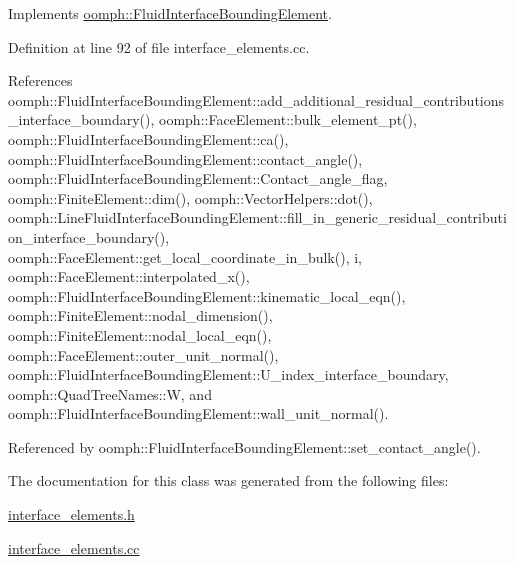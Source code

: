 Implements \hyperlink{classoomph_1_1FluidInterfaceBoundingElement_a69fa099e0cbfe8ae028a4edc77fedc60}{oomph\+::\+Fluid\+Interface\+Bounding\+Element}.



Definition at line 92 of file interface\+\_\+elements.\+cc.



References oomph\+::\+Fluid\+Interface\+Bounding\+Element\+::add\+\_\+additional\+\_\+residual\+\_\+contributions\+\_\+interface\+\_\+boundary(), oomph\+::\+Face\+Element\+::bulk\+\_\+element\+\_\+pt(), oomph\+::\+Fluid\+Interface\+Bounding\+Element\+::ca(), oomph\+::\+Fluid\+Interface\+Bounding\+Element\+::contact\+\_\+angle(), oomph\+::\+Fluid\+Interface\+Bounding\+Element\+::\+Contact\+\_\+angle\+\_\+flag, oomph\+::\+Finite\+Element\+::dim(), oomph\+::\+Vector\+Helpers\+::dot(), oomph\+::\+Line\+Fluid\+Interface\+Bounding\+Element\+::fill\+\_\+in\+\_\+generic\+\_\+residual\+\_\+contribution\+\_\+interface\+\_\+boundary(), oomph\+::\+Face\+Element\+::get\+\_\+local\+\_\+coordinate\+\_\+in\+\_\+bulk(), i, oomph\+::\+Face\+Element\+::interpolated\+\_\+x(), oomph\+::\+Fluid\+Interface\+Bounding\+Element\+::kinematic\+\_\+local\+\_\+eqn(), oomph\+::\+Finite\+Element\+::nodal\+\_\+dimension(), oomph\+::\+Finite\+Element\+::nodal\+\_\+local\+\_\+eqn(), oomph\+::\+Face\+Element\+::outer\+\_\+unit\+\_\+normal(), oomph\+::\+Fluid\+Interface\+Bounding\+Element\+::\+U\+\_\+index\+\_\+interface\+\_\+boundary, oomph\+::\+Quad\+Tree\+Names\+::W, and oomph\+::\+Fluid\+Interface\+Bounding\+Element\+::wall\+\_\+unit\+\_\+normal().



Referenced by oomph\+::\+Fluid\+Interface\+Bounding\+Element\+::set\+\_\+contact\+\_\+angle().



The documentation for this class was generated from the following files\+:\begin{DoxyCompactItemize}
\item 
\hyperlink{interface__elements_8h}{interface\+\_\+elements.\+h}\item 
\hyperlink{interface__elements_8cc}{interface\+\_\+elements.\+cc}\end{DoxyCompactItemize}
